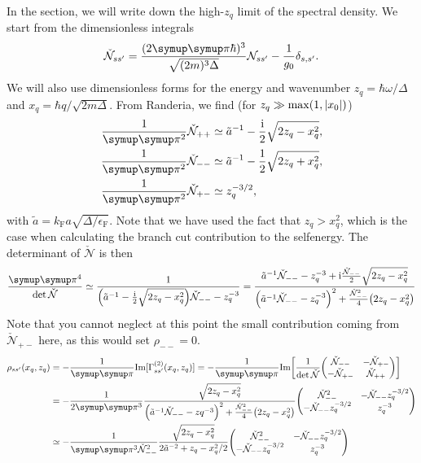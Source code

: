 \documentclass[10pt,a4paper]{article}
\let\canpi\pi
\renewcommand\pi{\symup\canpi}%
\newcommand{\ii}{\ensuremath{\mathrm{i}}}
\newcommand{\eF}{\ensuremath{\epsilon_\mathrm{F}}}
\newcommand{\kF}{\ensuremath{k_\mathrm{F}}}
\begin{document}
In the section, we will write down the high-$z_q$ limit of the spectral density. We start from the dimensionless integrals 
\begin{equation}
    \check{\mathcal{N}}_{ss^\prime} = \frac{(2\pi\hbar)^3}{\sqrt{(2m)^3\Delta}}
        \mathcal{N}_{ss^\prime} - \frac{1}{g_0} \delta_{s,s^\prime}.
\end{equation}
We will also use dimensionless forms for the energy and wavenumber $z_q = \hbar \omega/\Delta$ and $x_q= \hbar q/\sqrt{2m\Delta}$. From Randeria, we find (for $z_q \gg \max(1,\abs{x_0})$)
\begin{align}
    \frac{1}{\pi^2}\check{\mathcal{N}}_{++} &\simeq \tilde{a}^{-1} 
        - \frac{\ii}{2} \sqrt{2 z_q-x_q^2}, \\
    \frac{1}{\pi^2}\check{\mathcal{N}}_{--} &\simeq \tilde{a}^{-1} 
        - \frac{1}{2} \sqrt{2 z_q+x_q^2}, \\
    \frac{1}{\pi^2}\check{\mathcal{N}}_{+-} &\simeq z_q^{-3/2},
\end{align}
with $\tilde{a} = \kF a \sqrt{\Delta/\eF}$. Note that we have used the fact that $z_q>x_q^2$, which is the case when calculating the branch cut contribution to the selfenergy. The determinant of $\check{\mathcal{N}}$ is then
\begin{equation}
    \frac{\pi^4}{\det \check{\mathcal{N}}} \simeq \frac{1}{
    \qty( 
        \tilde{a}^{-1} - \frac{\ii}{2} \sqrt{2 z_q-x_q^2}
    )\check{\mathcal{N}}_{--} - z_q^{-3}} 
    = \frac{
        \tilde{a}^{-1} \check{\mathcal{N}}_{--} - z_q^{-3} 
        + \ii \frac{\check{\mathcal{N}}_{--}}{2} \sqrt{2 z_q-x_q^2}
    }{
        \qty(\tilde{a}^{-1} \check{\mathcal{N}}_{--} - z_q^{-3})^{2}
        + \frac{\check{\mathcal{N}}^2_{--}}{4} \qty(2 z_q-x_q^2)
    }
\end{equation}
Note that you cannot neglect at this point the small contribution coming from $\check{\mathcal{N}}_{+-}$ here, as this would set $\rho_{--}=0$.
\begin{align}
    \rho_{ss^\prime}(x_q,z_q) &= 
    -\frac{1}{\pi}\mathrm{Im}[\Gamma^{(2)}_{ss^\prime}(x_q,z_q)]
    = -\frac{1}{\pi}\mathrm{Im}\qty[
        \frac{1}{\det \check{\mathcal{N}}} \mqty(
            \check{\mathcal{N}}_{--} & -\check{\mathcal{N}}_{+-} \\
            -\check{\mathcal{N}}_{+-} & \check{\mathcal{N}}_{++}
        )] \\
    &=-\frac{1}{2\pi^3}\frac{ \sqrt{2 z_q-x_q^2} }{
        \qty(\tilde{a}^{-1} \check{\mathcal{N}}_{--} - zq^{-3})^{2}
        + \frac{\check{\mathcal{N}}^2_{--}}{4} \qty(2 z_q-x_q^2)
    } \mqty(
        \check{\mathcal{N}}^2_{--}  
            & -\check{\mathcal{N}}_{--} z_q^{-3/2}  \\
        -\check{\mathcal{N}}_{--} z_q^{-3/2}  
            & z_q^{-3}  
    ) \\
    &\simeq -\frac{1}{\pi^3\check{\mathcal{N}}^2_{--}}
    \frac{ \sqrt{2 z_q-x_q^2} }{
        2\tilde{a}^{-2} + z_q - x_q^2/2
    } \mqty(
        \check{\mathcal{N}}^2_{--}  
            & -\check{\mathcal{N}}_{--} z_q^{-3/2}  \\
        -\check{\mathcal{N}}_{--} z_q^{-3/2}  
            & z_q^{-3}  
    )
\end{align}
\end{document}
